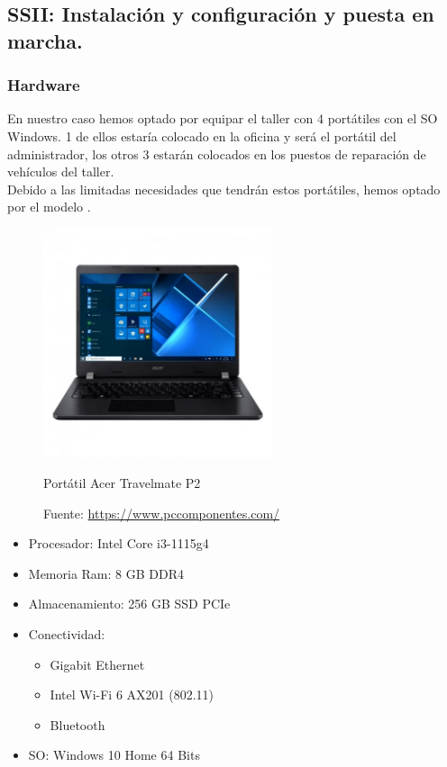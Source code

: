 \documentclass{article}
\begin{document}
\subsection{SSII: Instalación y configuración y puesta en marcha.} 
\label{subsection:Sistemas}
\subsubsection{Hardware}
En nuestro caso hemos optado por equipar el taller con 4 portátiles con el SO Windows. 1 de ellos estaría colocado en la oficina y será el portátil del administrador, los otros 3 estarán colocados 
en los puestos de reparación de vehículos del taller.\\
Debido a las limitadas necesidades que tendrán estos portátiles, hemos optado por el modelo \href{https://www.pccomponentes.com/acer-travelmate-p2-tmp214-53-37at-intel-core-i3-1115g4-8gb-256gb-ssd-14}{}.\\
\begin{figure}[H]
  \centering
  \includegraphics[width=0.6\textwidth]{CapturasSistemas/portatil.png}
  \caption{Portátil Acer Travelmate P2}
  \caption*{Fuente: \href{https://www.pccomponentes.com/acer-travelmate-p2-tmp214-53-37at-intel-core-i3-1115g4-8gb-256gb-ssd-14}{https://www.pccomponentes.com/}}
\end{figure}
\begin{itemize}
  \item Procesador: Intel Core i3-1115g4
  \item Memoria Ram: 8 GB DDR4
  \item Almacenamiento: 256 GB SSD PCIe
  \item Conectividad: \begin{itemize}
    \item Gigabit Ethernet
    \item Intel Wi-Fi 6 AX201 (802.11)
    \item Bluetooth
  \end{itemize}
  \item SO: Windows 10 Home 64 Bits
\end{itemize}
\end{document}
